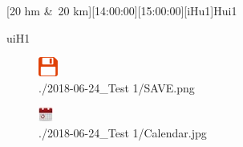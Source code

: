 \begin{minipage}{\textwidth}[20 hm \&~20 km][14:00:00][15:00:00][iHu1]\label{2018-06-24-Test  1}Hui1





 uiH1



\end{minipage}\begin{figure}\centering\includegraphics[angle=0,origin=c,height=0.25\textheight]{./Bilder/2018-06-24_Test  1/SAVE.png}\caption*{./2018-06-24\_Test  1/SAVE.png}\end{figure}\begin{figure}\centering\includegraphics[angle=0,origin=c,height=0.25\textheight]{./Bilder/2018-06-24_Test  1/Calendar.jpg}\caption*{./2018-06-24\_Test  1/Calendar.jpg}\end{figure}\vspace{2em} ~\newline 
